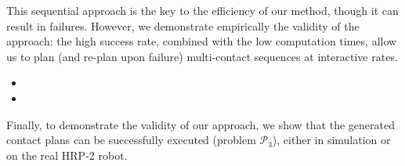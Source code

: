 This sequential approach is the key to the efficiency of our method, though it
can result in failures. However, we demonstrate empirically the validity of the approach: the high success rate, combined with the low computation times, allow us to plan (and re-plan upon failure) multi-contact sequences at \gls{interactive} rates.

\begin{itemize}
\item {}
\item {}
\end{itemize}

Finally, to demonstrate the validity of our approach, we show that the generated contact plans  can be successfully executed (problem  $\mathcal{P}_3$), either in simulation or on the real HRP-2 robot.


